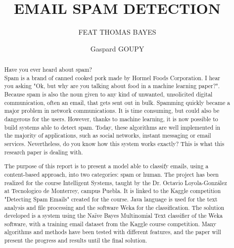 \documentclass[runningheads]{llncs}
\begin{document}
%
\title{EMAIL SPAM DETECTION}
\subtitle{FEAT THOMAS BAYES}
%
\author{Gaspard GOUPY}
%
%
\maketitle
%
%
\begin{abstract}
%
Have you ever heard about spam?\\ Spam is a brand of canned cooked pork made by Hormel Foods Corporation. I hear you asking "Ok, but why are you talking about food in a machine learning paper?". Because spam is also the noun given to any kind of unwanted, unsolicited digital communication, often an email, that gets sent out in bulk. Spamming quickly became a major problem in network communications. It is time consuming, but could also be dangerous for the users. However, thanks to machine learning, it is now possible to build systems able to detect spam. Today, these algorithms are well implemented in the majority of applications, such as social networks, instant messaging or email services. Nevertheless, do you know how this system works exactly? This is what this research paper is dealing with. \par
The purpose of this report is to present a model able to classify emails, using a content-based approach, into two categories: spam or human. The project has been realized for the course Intelligent Systems, taught by the Dr. Octavio Loyola-González at Tecnologico de Monterrey, campus Puebla. It is linked to the Kaggle competition "Detecting Spam Emails" created for the course. Java language is used for the text analysis and file processing and the software Weka for the classification. The solution developed is a system using the Naïve Bayes Multinomial Text classifier of the Weka software, with a training email dataset from  the Kaggle course competition. Many algorithms and methods have been tested with different features, and the paper will present the progress and results until the final solution. 
%
%
\end{abstract}
%
%
%
\end{document}

